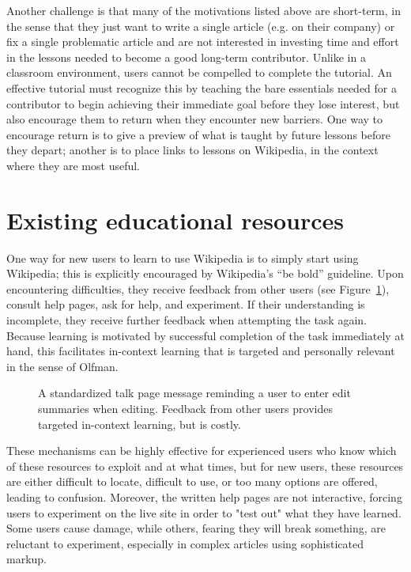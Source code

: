 \documentclass{acm_proc_article-sp}
\begin{document}
Another challenge is that many of the motivations listed above are short-term, in the sense that they just want to write a single article (e.g. on their company) or fix a single problematic article and are not interested in investing time and effort in the lessons needed to become a good long-term contributor. Unlike in a classroom environment, users cannot be compelled to complete the tutorial. An effective tutorial must recognize this by teaching the bare essentials needed for a contributor to begin achieving their immediate goal before they lose interest, but also encourage them to return when they encounter new barriers. One way to encourage return is to give a preview of what is taught by future lessons before they depart; another is to place links to lessons on Wikipedia, in the context where they are most useful.

\section{Existing educational resources}

One way for new users to learn to use Wikipedia is to simply start using Wikipedia; this is explicitly encouraged by Wikipedia's ``be bold'' guideline. Upon encountering difficulties, they receive feedback from other users (see Figure~\ref{fig:talktemplate}), consult help pages, ask for help, and experiment. If their understanding is incomplete, they receive further feedback when attempting the task again. Because learning is motivated by successful completion of the task immediately at hand, this facilitates in-context learning that is targeted and personally relevant in the sense of Olfman.\cite{Olfman:1991}

\begin{figure}
\centering
{}
\caption{A standardized talk page message reminding a user to enter edit summaries when editing. Feedback from other users provides targeted in-context learning, but is costly.}
\label{fig:talktemplate}
\end{figure}

These mechanisms can be highly effective for experienced users who know which of these resources to exploit and at what times, but for new users, these resources are either difficult to locate, difficult to use, or too many options are offered, leading to confusion. Moreover, the written help pages are not interactive, forcing users to experiment on the live site in order to "test out" what they have learned. Some users cause damage, while others, fearing they will break something, are reluctant to experiment, especially in complex articles using sophisticated markup.
\end{document}
